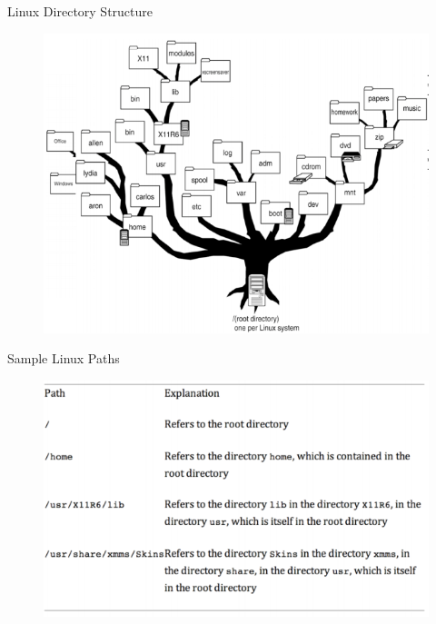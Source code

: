 \documentclass{if-beamer}
\begin{document}
\begin{frame}{Linux Directory Structure}
\begin{figure}
\centering
\includegraphics[scale=0.5]{linux_directories.PNG}
\end{figure}
\end{frame}
\begin{frame}{Sample Linux Paths}
\begin{figure}
\centering
\includegraphics[scale=0.6]{linux_paths.PNG}
\end{figure}
\end{frame}
\end{document}
